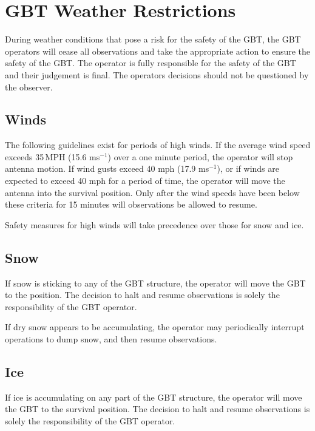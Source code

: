 \newpage


\section{GBT Weather Restrictions}

During weather conditions that pose a risk for the safety of the GBT,
the GBT operators will cease all observations and take the appropriate
action to ensure the safety of the GBT.  The operator is fully 
responsible for the safety of the GBT and their judgement is final.
The operators decisions should not be questioned by the observer.

\subsection{Winds}

The following guidelines exist for periods of high winds.  If the 
average wind speed exceeds 35\,MPH (15.6 ms$^{-1}$) over a one minute
period, the operator will stop antenna motion.  If wind gusts exceed
40 mph (17.9 ms$^{-1}$), or if winds are expected to exceed 40 mph
for a period of time, the operator will move the antenna into the
survival position.  Only after the wind speeds have been below these
criteria for 15 minutes will observations be allowed to resume.

Safety measures for high winds will take precedence over those for
snow and ice.

\subsection{Snow}

If snow is sticking to any of the GBT structure, the operator will
move the GBT to the  position.  The decision to halt
and resume observations is solely the responsibility of the GBT operator.

If dry snow appears to be accumulating, the operator may periodically 
interrupt operations to dump snow, and then resume observations.


\subsection{Ice}

If ice is accumulating on any part of the GBT structure, the operator will
move the GBT to the survival position.  The decision to halt
and resume observations is solely the responsibility of the GBT operator.

